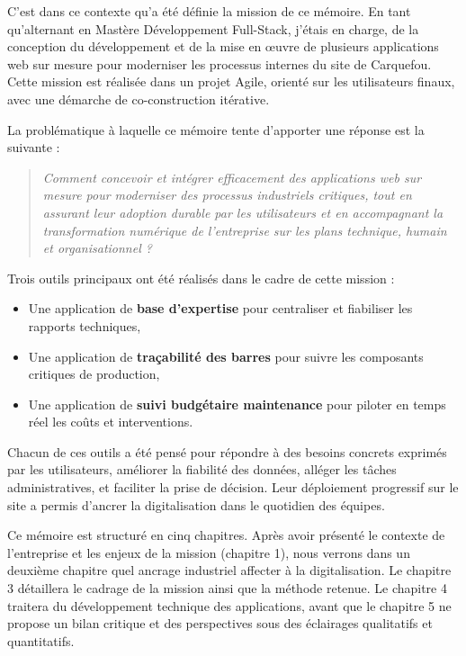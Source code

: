\documentclass[11pt,a4paper]{article}
\begin{document}
C’est dans ce contexte qu’a été définie la mission de ce mémoire. En tant qu’alternant en Mastère Développement Full-Stack,  j’étais en charge, de la conception du développement et de la mise en œuvre de plusieurs applications web sur mesure pour moderniser les processus internes du site de Carquefou. Cette mission est réalisée dans un projet Agile, orienté sur les utilisateurs finaux, avec une démarche de co-construction itérative.

La problématique à laquelle ce mémoire tente d’apporter une réponse est la suivante :

\begin{quote}
\emph{Comment concevoir et intégrer efficacement des applications web sur mesure pour moderniser des processus industriels critiques, tout en assurant leur adoption durable par les utilisateurs et en accompagnant la transformation numérique de l’entreprise sur les plans technique, humain et organisationnel ?
}
\end{quote}

Trois outils principaux ont été réalisés dans le cadre de cette mission :
\begin{itemize}
    \item Une application de \textbf{base d’expertise} pour centraliser et fiabiliser les rapports techniques,
    \item Une application de \textbf{traçabilité des barres} pour suivre les composants critiques de production,
    \item Une application de \textbf{suivi budgétaire maintenance} pour piloter en temps réel les coûts et interventions.
\end{itemize}

Chacun de ces outils a été pensé pour répondre à des besoins concrets exprimés par les utilisateurs, améliorer la fiabilité des données, alléger les tâches administratives, et faciliter la prise de décision. Leur déploiement progressif sur le site a permis d’ancrer la digitalisation dans le quotidien des équipes.

Ce mémoire est structuré en cinq chapitres. Après avoir présenté le contexte de l’entreprise et les enjeux de la mission (chapitre 1), nous verrons dans un deuxième chapitre quel ancrage industriel affecter à la digitalisation. Le chapitre 3 détaillera le cadrage de la mission ainsi que la méthode retenue. Le chapitre 4 traitera du développement technique des applications, avant que le chapitre 5 ne propose un bilan critique et des perspectives sous des éclairages qualitatifs et quantitatifs.
\end{document}
